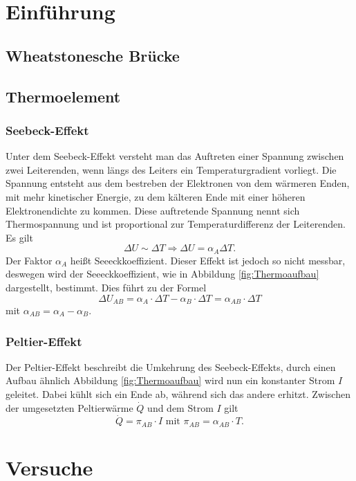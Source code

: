 \section{Einführung}
\subsection{Wheatstonesche Brücke}
\subsection{Thermoelement}
\subsubsection{Seebeck-Effekt}
Unter dem Seebeck-Effekt versteht man das Auftreten einer Spannung zwischen zwei Leiterenden, wenn  längs des Leiters ein Temperaturgradient vorliegt. Die Spannung entsteht aus dem bestreben der Elektronen von dem wärmeren Enden, mit mehr kinetischer Energie, zu dem kälteren Ende mit einer höheren Elektronendichte zu kommen. Diese auftretende Spannung nennt sich Thermospannung und ist proportional zur Temperaturdifferenz der Leiterenden. Es gilt
\begin{equation}
\Delta U \sim \Delta T \Rightarrow \Delta U= \alpha_A\Delta T.
\end{equation} 
Der Faktor $\alpha_A$ heißt Seeeckkoeffizient. Dieser Effekt ist jedoch so nicht messbar, deswegen wird der Seeeckkoeffizient, wie in Abbildung \ref{fig:Thermoaufbau} dargestellt, bestimmt. Dies führt zu der Formel
\begin{equation}
\Delta U_{AB}=\alpha_A\cdot \Delta T -\alpha_B\cdot \Delta T = \alpha_{AB}\cdot \Delta T
\label{eq:Thermo}
\end{equation}
mit $\alpha_{AB}=\alpha_A-\alpha_B$.
\subsubsection{Peltier-Effekt}
Der Peltier-Effekt beschreibt die Umkehrung des Seebeck-Effekts, durch einen Aufbau ähnlich Abbildung \ref{fig:Thermoaufbau} wird nun ein konstanter Strom $I$ geleitet. Dabei kühlt sich ein Ende ab, während sich das andere erhitzt. Zwischen der umgesetzten Peltierwärme $\dot Q$ und dem Strom $I$ gilt
\begin{equation}
\dot Q = \pi_{AB}\cdot I \text{ mit } \pi_{AB}=\alpha_{AB}\cdot T.
\end{equation}
\section{Versuche}
